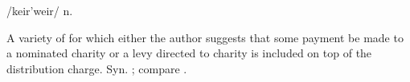  /keir'weir/ n.

A variety of  for which either the author suggests that
some payment be made to a nominated charity or a levy directed to charity is
included on top of the distribution charge. Syn. ;
compare .

